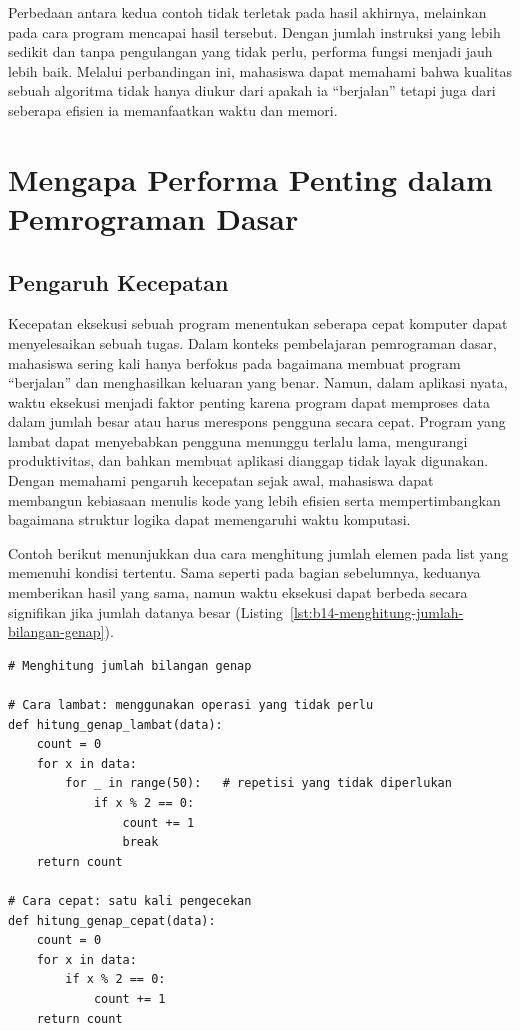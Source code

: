 Perbedaan antara kedua contoh tidak terletak pada hasil akhirnya, melainkan pada cara program mencapai hasil tersebut. Dengan jumlah instruksi yang lebih sedikit dan tanpa pengulangan yang tidak perlu, performa fungsi menjadi jauh lebih baik. Melalui perbandingan ini, mahasiswa dapat memahami bahwa kualitas sebuah algoritma tidak hanya diukur dari apakah ia “berjalan” tetapi juga dari seberapa efisien ia memanfaatkan waktu dan memori.


\section{Mengapa Performa Penting dalam Pemrograman Dasar}

\subsection{Pengaruh Kecepatan}

Kecepatan eksekusi sebuah program menentukan seberapa cepat komputer dapat menyelesaikan sebuah tugas. Dalam konteks pembelajaran pemrograman dasar, mahasiswa sering kali hanya berfokus pada bagaimana membuat program “berjalan” dan menghasilkan keluaran yang benar. Namun, dalam aplikasi nyata, waktu eksekusi menjadi faktor penting karena program dapat memproses data dalam jumlah besar atau harus merespons pengguna secara cepat. Program yang lambat dapat menyebabkan pengguna menunggu terlalu lama, mengurangi produktivitas, dan bahkan membuat aplikasi dianggap tidak layak digunakan. Dengan memahami pengaruh kecepatan sejak awal, mahasiswa dapat membangun kebiasaan menulis kode yang lebih efisien serta mempertimbangkan bagaimana struktur logika dapat memengaruhi waktu komputasi.

Contoh berikut menunjukkan dua cara menghitung jumlah elemen pada list yang memenuhi kondisi tertentu. Sama seperti pada bagian sebelumnya, keduanya memberikan hasil yang sama, namun waktu eksekusi dapat berbeda secara signifikan jika jumlah datanya besar (Listing~\ref{lst:b14-menghitung-jumlah-bilangan-genap}).

\begin{lstlisting}[style=PythonStyle, caption={Menghitung jumlah bilangan genap}, label={lst:b14-menghitung-jumlah-bilangan-genap}]
# Menghitung jumlah bilangan genap

# Cara lambat: menggunakan operasi yang tidak perlu
def hitung_genap_lambat(data):
    count = 0
    for x in data:
        for _ in range(50):   # repetisi yang tidak diperlukan
            if x % 2 == 0:
                count += 1
                break
    return count

# Cara cepat: satu kali pengecekan
def hitung_genap_cepat(data):
    count = 0
    for x in data:
        if x % 2 == 0:
            count += 1
    return count
\end{lstlisting}

